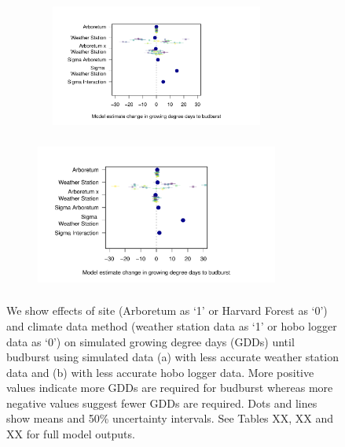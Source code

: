 \documentclass{article}\usepackage[]{graphicx}\usepackage[]{color}
\begin{document}
\begin{figure}[H]
  \begin{subfigure}{.5\textwidth}
    \caption{}
    \centering
    \includegraphics[height=4cm, width=8cm]{..//analyses/figures/muplot_noisyws.pdf}
    \label{fig:muplotnoisyws}
  \end{subfigure}%
    \begin{subfigure}{.5\textwidth}
      \caption{}
      \centering
      \includegraphics[height=5cm, width=8cm]{..//analyses/figures/muplot_noisyhobo.pdf}
    \label{fig:muplotnoisyhobo}
  \end{subfigure}
\caption{ We show effects of site (Arboretum as `1' or Harvard Forest as `0') and climate data method (weather station data as `1' or hobo logger data as `0') on simulated growing degree days (GDDs) until budburst using simulated data (a) with less accurate weather station data and (b) with less accurate hobo logger data. More positive values indicate more GDDs are required for budburst whereas more negative values suggest fewer GDDs are required. Dots and lines show means and 50\% uncertainty intervals. See Tables XX, XX and XX for full model outputs.}
\label{fig:simsmus}
\end{figure}
\end{document}
